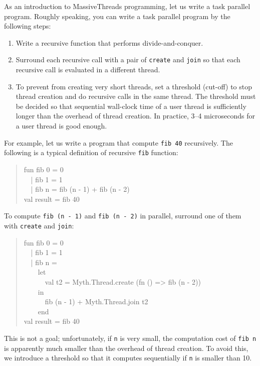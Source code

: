 \documentclass{jbook}
\newenvironment{program}{\begin{quote}\begin{tt}}%
                        {\end{tt}\end{quote}}
\begin{document}
	As an introduction to MassiveThreads programming,
let us write a task parallel program.
	Roughly speaking,
you can write a task parallel program by the following steps:
\begin{enumerate}
\item
	Write a recursive function that performs divide-and-conquer.
\item
	Surround each recursive call with a pair of
{\tt create} and {\tt join} so that
each recursive call is evaluated in a different thread.
\item
	To prevent from creating very short threads,
set a threshold (cut-off) to stop thread creation and do recursive
calls in the same thread.
	The threshold must be decided so that
sequential wall-clock time of a user thread is sufficiently longer than
the overhead of thread creation.
	In practice, 3--4 microseconds for a user thread is good enough.
\end{enumerate}
	For example, let us write a program that compute {\tt fib 40}
recursively.
	The following is a typical definition of recursive {\tt fib} function:
\begin{program}
fun fib 0 = 0\\
\ \ | fib 1 = 1\\
\ \ | fib n = fib (n - 1) + fib (n - 2)\\
val result = fib 40
\end{program}
	To compute 
{\tt fib (n - 1)} and {\tt fib (n - 2)} in parallel,
surround one of them with {\tt create} and {\tt join}:
\begin{program}
fun fib 0 = 0\\
\ \ | fib 1 = 1\\
\ \ | fib n =\\
\ \ \ \ let\\
\ \ \ \ \ \ val t2 = Myth.Thread.create (fn () => fib (n - 2))\\
\ \ \ \ in\\
\ \ \ \ \ \ fib (n - 1) + Myth.Thread.join t2\\
\ \ \ \ end\\
val result = fib 40
\end{program}
        This is not a goal; unfortunately,
if {\tt n} is very small,
the computation cost of {\tt fib n} is apparently much smaller than
the overhead of thread creation.
	To avoid this,
we introduce a threshold
so that it computes sequentially if {\tt n} is smaller than 10.
\end{document}
